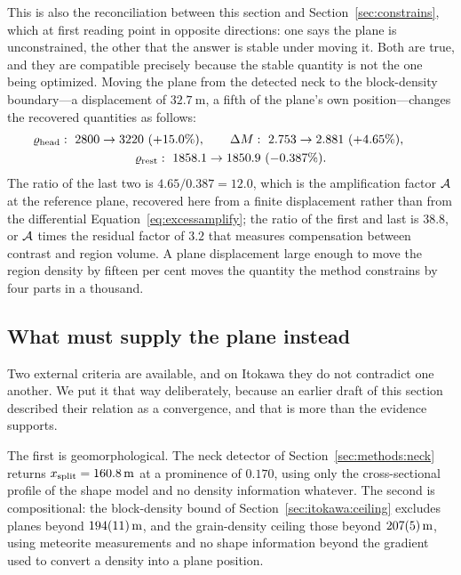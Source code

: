This is also the reconciliation between this section and
Section~\ref{sec:constrains}, which at first reading point in opposite
directions: one says the plane is unconstrained, the other that the answer
is stable under moving it. Both are true, and they are compatible precisely
because the stable quantity is not the one being optimized. Moving the plane
from the detected neck to the block-density boundary---a displacement of
$\SI{32.7}{\metre}$, a fifth of the plane's own position---changes the
recovered quantities as follows:
%
\begin{multline}
\varrho_{\mathrm{head}}:\ 2800 \to 3220\ (+15.0\%),
\qquad
\Delta M:\ 2.753 \to 2.881\ (+4.65\%),
\qquad \\
\varrho_{\mathrm{rest}}:\ 1858.1 \to 1850.9\ (-0.387\%).
\label{eq:plane:move}
\end{multline}
%
The ratio of the last two is $4.65/0.387 = 12.0$, which is the amplification
factor $\mathcal{A}$ at the reference plane, recovered here from a finite
displacement rather than from the differential
Equation~\eqref{eq:excessamplify}; the ratio of the first and last is
$38.8$, or $\mathcal{A}$ times the residual factor of $3.2$ that measures
compensation between contrast and region volume. A plane displacement large
enough to move the region density by fifteen per cent moves the quantity the
method constrains by four parts in a thousand.

\subsection{What must supply the plane instead}
\label{sec:plane:external}

Two external criteria are available, and on Itokawa they do not contradict
one another. We put it that way deliberately, because an earlier draft of
this section described their relation as a convergence, and that is more
than the evidence supports.

The first is geomorphological. The neck detector of
Section~\ref{sec:methods:neck} returns
$x_{\mathrm{split}} = \SI{160.8}{\metre}$ at a prominence of $0.170$, using only the
cross-sectional profile of the shape model and no density information
whatever. The second is compositional: the block-density bound of
Section~\ref{sec:itokawa:ceiling} excludes planes beyond
$\SI{194+-11}{\metre}$, and the grain-density ceiling those beyond
$\SI{207+-5}{\metre}$, using meteorite measurements and no shape information
beyond the gradient used to convert a density into a plane position.

